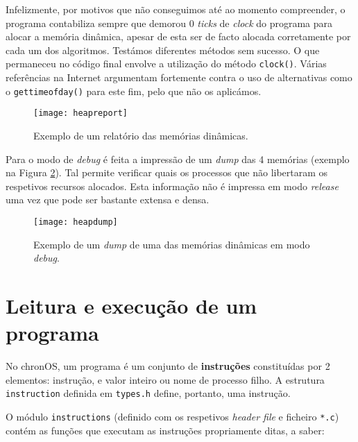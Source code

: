 \documentclass[10pt,oneside]{estiloUBI}
\newcommand{\chronOS}{\textsf{chronOS}}
\begin{document}
	Infelizmente, por motivos que não conseguimos até ao momento compreender, o programa contabiliza sempre que demorou 0 \textit{ticks} de \textit{clock} do programa para alocar a memória dinâmica, apesar de esta ser de facto alocada corretamente por cada um dos algoritmos. Testámos diferentes métodos sem sucesso. O que permaneceu no código final envolve a utilização do método \verb|clock()|. Várias referências na Internet argumentam fortemente contra o uso de alternativas como o \verb|gettimeofday()| para este fim, pelo que não os aplicámos.
	
	\begin{figure}[!htbp]
		\centering
		\texttt{[image: heapreport]}
		\caption{Exemplo de um relatório das memórias dinâmicas.}
		\label{fig:heapreport}
	\end{figure}

	Para o modo de \textit{debug} é feita a impressão de um \textit{dump} das 4 memórias (exemplo na Figura \ref{fig:heapdump}). Tal permite verificar quais os processos que não libertaram os respetivos recursos alocados. Esta informação não é impressa em modo \textit{release} uma vez que pode ser bastante extensa e densa.
	
	\begin{figure}[!htbp]
		\centering
		\texttt{[image: heapdump]}
		\caption{Exemplo de um \textit{dump} de uma das memórias dinâmicas em modo \textit{debug}.}
		\label{fig:heapdump}
	\end{figure}

	
	\chapter{Leitura e execução de um programa}
	\label{sec:program}
	
	No \chronOS, um programa é um conjunto de \textbf{instruções} constituídas por 2 elementos: instrução, e valor inteiro ou nome de processo filho. A estrutura \verb|instruction| definida em \verb|types.h| define, portanto, uma instrução.
	
	O módulo \texttt{instructions} (definido com os respetivos \textit{header file} e ficheiro \verb|*.c|) contém as funções que executam as instruções propriamente ditas, a saber:
	
\end{document}
